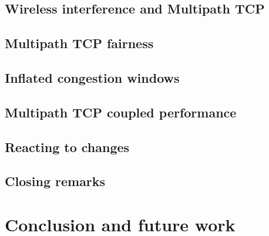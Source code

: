 \documentclass[12pt,a4paper]{article}
\begin{document}
\subsection{Wireless interference and Multipath TCP}
\label{sec:results-mptcp}

\FloatBarrier
\clearpage
\subsection{Multipath TCP fairness}
\label{sec:results-fairness}

\FloatBarrier
\clearpage
\subsection{Inflated congestion windows}
\label{sec:results-inflated}

\FloatBarrier
\clearpage
\subsection{Multipath TCP coupled performance}
\label{sec:results-performance}

\FloatBarrier
\clearpage
\subsection{Reacting to changes}
\label{sec:results-reacting}

\FloatBarrier
\clearpage
\subsection{Closing remarks}
\label{sec:results-closing-remarks}

\FloatBarrier

\clearpage
\section{Conclusion and future work}
\label{sec:conclusion}

\end{document}
